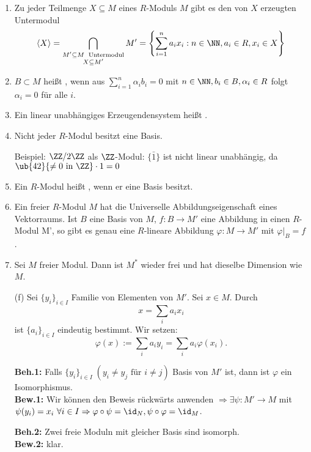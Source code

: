 \begin{Bem}
  \begin{enumerate}
    \item Zu jeder Teilmenge $X \subseteq M$ eines $R$-Moduls $M$ gibt es den von
          $X$ erzeugten Untermodul $$\langle X \rangle = \displaystyle 
          \bigcap_{\substack{M' \subseteq M\; \text{ Untermodul} \\ X \subseteq M'}} M' = \left\{
          \sum_{i=1}^n a_i x_i: n \in \NN, a_i \in R, x_i \in X \right\}$$
    \item $B \subset M$ heißt ,
          wenn aus $\displaystyle \sum_{i=1}^n \alpha_i b_i = 0$ mit $n \in
          \NN, b_i \in B, \alpha_i \in R$ folgt $\alpha_i = 0$ für alle
          $i$.
    \item Ein linear unabhängiges Erzeugendensystem heißt
          .
    \item Nicht jeder $R$-Modul besitzt eine Basis.

          Beispiel: $\ZZ/2\ZZ$ als $\ZZ$-Modul: $\{\bar{1}\}$
          ist nicht linear unabhängig, da $\ub{42}{\not= 0 \text{ in } \ZZ} \cdot 1 = 0$
    \item Ein $R$-Modul heißt , wenn er eine
          Basis besitzt.
    \item Ein freier $R$-Modul $M$ hat die Universelle Abbildungseigenschaft eines Vektorraums. Ist $B$ eine
          Basis von $M$, $f: B \to M'$ eine Abbildung in einen $R$-Modul M', so
          gibt es genau eine $R$-lineare Abbildung $\varphi: M \to M'$ mit
          $\varphi|_B = f$.
    \item Sei $M$ freier Modul. Dann ist $M^*$ wieder frei und hat dieselbe
          Dimension wie $M$.
  \end{enumerate}
\end{Bem}

\begin{Bew}
\begin{enumerate}
\item[(f)] Sei $\{y_i\}_{i \in I}$ Familie von Elementen von $M'$.
Sei $x \in M$. Durch
\[
x=\sum_{i}a_ix_i
\]
ist $\{a_i\}_{i  \in I}$ eindeutig bestimmt. Wir setzen:
\[
\varphi(x):=\sum_i a_iy_i=\sum_ia_i\varphi(x_i).
\]

\textbf{Beh.1:} Falls $\{y_i\}_{i\in I}\;(y_i \neq y_j \text{ für } i\neq
j)$ Basis von $M'$ ist, dann ist $\varphi$ ein Isomorphismus.\\
\textbf{Bew.1:} Wir können den Beweis rückwärts anwenden
$\Rightarrow \exists \psi:
M' \rightarrow M$  mit $\psi(y_i)=x_i \ \forall i \in I \Rightarrow
\varphi \circ \psi = \id_N, \psi \circ \varphi = \id_M$.

\textbf{Beh.2:} Zwei freie Moduln mit gleicher Basis sind isomorph.\\
\textbf{Bew.2:} klar.
\end{enumerate}
\end{Bew}

